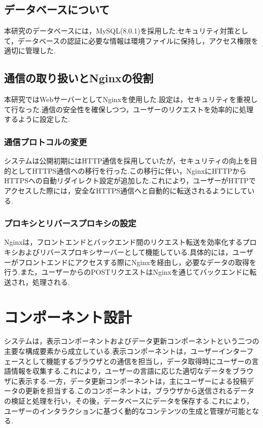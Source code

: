 \documentclass[b5paper,12pt,dvipdfmx]{jsreport}
\begin{document}
\subsection{データベースについて}
本研究のデータベースには，MySQL(8.0.1)を採用した.セキュリティ対策として，データベースの認証に必要な情報は環境ファイルに保持し，アクセス権限を適切に管理した.


\subsection{通信の取り扱いとNginxの役割}
本研究ではWebサーバーとしてNginxを使用した.設定は，セキュリティを重視して行なった.通信の安全性を確保しつつ，ユーザーのリクエストを効率的に処理するように設定した.

\subsubsection{通信プロトコルの変更}
システムは公開初期にはHTTP通信を採用していたが，セキュリティの向上を目的としてHTTPS通信への移行を行った.この移行に伴い，NginxにHTTPからHTTPSへの自動リダイレクト設定が追加した.これにより，ユーザーがHTTPでアクセスした際には，安全なHTTPS通信へと自動的に転送されるようにしている.

\subsubsection{プロキシとリバースプロキシの設定}
Nginxは，フロントエンドとバックエンド間のリクエスト転送を効率化するプロキシおよびリバースプロキシサーバーとして機能している.具体的には，ユーザーがフロントエンドにアクセスする際にNginxを経由し，必要なデータの取得を行う.また，ユーザーからのPOSTリクエストはNginxを通じてバックエンドに転送され，処理される.


\section{コンポーネント設計}
システムは，表示コンポーネントおよびデータ更新コンポーネントという二つの主要な構成要素から成立している.表示コンポーネントは，ユーザーインターフェースとして機能するブラウザとの通信を担当し，データ取得時にユーザーの言語情報を収集する.これにより，ユーザーの言語に応じた適切なデータをブラウザに表示する.一方，データ更新コンポーネントは，主にユーザーによる投稿データの更新を担当する.このコンポーネントは，ブラウザから送信されるデータの検証と処理を行い，その後，データベースにデータを保存する.これにより，ユーザーのインタラクションに基づく動的なコンテンツの生成と管理が可能となる.
\end{document}
